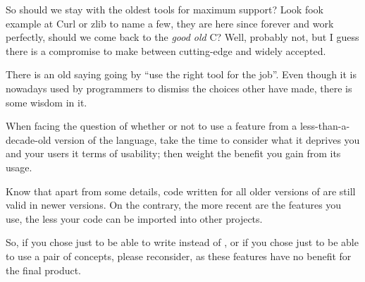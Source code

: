 So should we stay with the oldest tools for maximum support? Look fook
example at Curl or zlib to name a few, they are here since forever and
work perfectly, should we come back to the \emph{good old} C? Well,
probably not, but I guess there is a compromise to make between
cutting-edge and widely accepted.

\begin{guideline}
  There is an old saying going by ``use the right tool for the
  job''. Even though it is nowadays used by programmers to dismiss the choices
  other have made, there is some wisdom in it.

  When facing the question of whether or not to use a feature from a
  less-than-a-decade-old version of the language, take the time to
  consider what it deprives you and your users it terms of
  usability; then weight the benefit you gain from its usage.

  Know that apart from some details, code written for all older
  versions of \cpp{} are still valid in newer versions. On the
  contrary, the more recent are the features you use, the less your
  code can be imported into other projects.

  So, if you chose  just to be able to write  instead of , or if you chose 
  just to be able to use a pair of concepts, please reconsider, as
  these features have no benefit for the final product.
\end{guideline}
